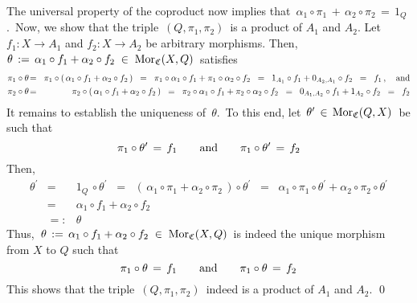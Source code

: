 \begin{enumerate}
	The universal property of the coproduct now implies that
	\,$\alpha_{1} \circ \pi_{1} \,+\, \alpha_{2} \circ \pi_{2} \,=\, 1_{Q}$.\,
	\vskip 0.1cm
	\noindent
	Now, we show that the triple \,$(Q,\pi_{1},\pi_{2})$\, is a product of $A_{1}$ and $A_{2}$.
	Let $f_{1} : X \longrightarrow A_{1}$ and $f_{2} : X \longrightarrow A_{2}$ be arbitrary morphisms.
	Then,
	\,$\theta \, := \, \alpha_{1} \circ f_{1} + \alpha_{2} \circ f_{2} \;\in\; \textnormal{Mor}_{\mathfrak{C}}(X,Q)$\,
	satisfies
	\begin{eqnarray*}
	\pi_{1} \circ \theta
	& \!=\! &
		\pi_{1} \circ (\,\alpha_{1} \circ f_{1} + \alpha_{2} \circ f_{2}\,)
	\;\; = \;\;
		\pi_{1} \circ \alpha_{1} \circ f_{1} + \pi_{1} \circ \alpha_{2} \circ f_{2}
	\;\; = \;\;
		1_{A_{1}} \circ f_{1} + 0_{A_{2},A_{1}} \circ f_{2} 
	\;\; = \;\;
		f_{1}\,,
	\quad\textnormal{and}
	\\
	\pi_{2} \circ \theta
	& \!=\! &
		\pi_{2} \circ (\,\alpha_{1} \circ f_{1} + \alpha_{2} \circ f_{2}\,)
	\;\; = \;\;
		\pi_{2} \circ \alpha_{1} \circ f_{1} + \pi_{2} \circ \alpha_{2} \circ f_{2}
	\;\; = \;\;
		0_{A_{1},A_{2}} \circ f_{1}  + 1_{A_{2}} \circ f_{2}
	\;\; = \;\;
		f_{2}
	\end{eqnarray*}
	It remains to establish the uniqueness of \,$\theta$.\,
	To this end, let \,$\theta^{\prime} \,\in\, \textnormal{Mor}_{\mathfrak{C}}(Q,X)$\, be such that
	\begin{equation*}
	\pi_{1} \circ \theta^{\prime} \,=\, f_{1}
	\quad\quad\textnormal{and}\quad\quad
	\pi_{1} \circ \theta^{\prime} \,=\, f_{2}
	\end{equation*}
	Then,
	\begin{eqnarray*}
	\theta^{\prime}
	& = &
		1_{Q} \,\circ \theta^{\prime} 
	\;\; = \;\;
		(\,\alpha_{1} \circ \pi_{1} + \alpha_{2} \circ \pi_{2}\,) \circ \theta^{\prime}
	\;\; = \;\;
		\alpha_{1} \circ \pi_{1} \circ \theta^{\prime} + \alpha_{2} \circ \pi_{2} \circ \theta^{\prime}
	\\
	& = &
		\alpha_{1} \circ f_{1} + \alpha_{2} \circ f_{2}
	\\
	& =: &
		\theta
	\end{eqnarray*}
	Thus,
	\,$\theta \, := \, \alpha_{1} \circ f_{1} + \alpha_{2} \circ f_{2} \;\in\; \textnormal{Mor}_{\mathfrak{C}}(X,Q)$\,
	is indeed the unique morphism from $X$ to $Q$ such that
	\begin{equation*}
	\pi_{1} \circ \theta \,=\, f_{1}
	\quad\quad\textnormal{and}\quad\quad
	\pi_{1} \circ \theta \,=\, f_{2}
	\end{equation*}
	This shows that the triple \,$(Q,\pi_{1},\pi_{2})$\, indeed is a product of $A_{1}$ and $A_{2}$.
	\qed
\end{enumerate}

